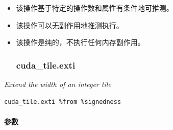 \documentclass{article}
\begin{document}
\begin{itemize}
\item 该操作基于特定的操作数和属性有条件地可推测。
\item 该操作可以无副作用地推测执行。
\item 该操作是纯的，不执行任何内存副作用。


\subsubsection{cuda\_tile.exti}

\end{itemize}
\textit{Extend the width of an integer tile}


\begin{lstlisting}
cuda_tile.exti %from %signedness
\end{lstlisting}

\paragraph{参数}
\end{document}
